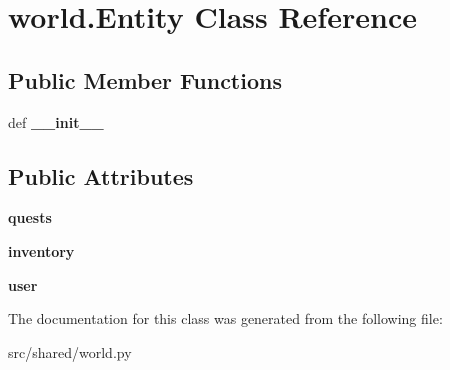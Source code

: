 \hypertarget{classworld_1_1_entity}{\section{world.\-Entity \-Class \-Reference}
\label{classworld_1_1_entity}
}
\subsection*{\-Public \-Member \-Functions}
\begin{DoxyCompactItemize}
\item 
\hypertarget{classworld_1_1_entity_ae3f6c9349b4756df29e482ae07582ca4}{def {\bfseries \-\_\-\-\_\-init\-\_\-\-\_\-}}\label{classworld_1_1_entity_ae3f6c9349b4756df29e482ae07582ca4}

\end{DoxyCompactItemize}
\subsection*{\-Public \-Attributes}
\begin{DoxyCompactItemize}
\item 
\hypertarget{classworld_1_1_entity_a02ac854a6a124cc8bfdef46ae7941434}{{\bfseries quests}}\label{classworld_1_1_entity_a02ac854a6a124cc8bfdef46ae7941434}

\item 
\hypertarget{classworld_1_1_entity_add2bc9bb2f731cc86228d8932a962e60}{{\bfseries inventory}}\label{classworld_1_1_entity_add2bc9bb2f731cc86228d8932a962e60}

\item 
\hypertarget{classworld_1_1_entity_a2e893d9acd136fa158874582882a3f13}{{\bfseries user}}\label{classworld_1_1_entity_a2e893d9acd136fa158874582882a3f13}

\end{DoxyCompactItemize}


\-The documentation for this class was generated from the following file\-:\begin{DoxyCompactItemize}
\item 
src/shared/world.\-py\end{DoxyCompactItemize}
